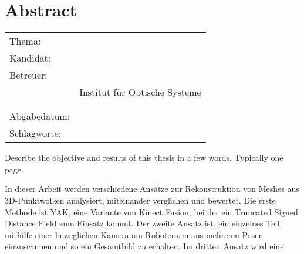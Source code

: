 \thispagestyle{plain}
\chapter*{Abstract}
\label{ch:abstract}


\begin{center}
	\begin{tabular}{p{3cm}p{10cm}}
		Thema: & \thema \\[1ex]
		Kandidat: & \autor \\[1ex]
		Betreuer: & \prueferA \\%
		 & Institut für Optische Systeme\\[1ex]
		 & \prueferB \\%
		 & \firma \\[1ex]
		Abgabedatum: & \abgabedatum \\[1ex]
		Schlagworte: & \schlagworte \\
	\end{tabular}
\end{center}


Describe the objective and results of this thesis in a few words.
Typically one page. %

In dieser Arbeit werden verschiedene Ansätze zur Rekonstruktion von Meshes aus 3D-Punktwolken analysiert, miteinander verglichen und bewertet.
Die erste Methode ist YAK, eine Variante von Kinect Fusion, bei der ein Truncated Signed Distance Field zum Einsatz kommt.
Der zweite Ansatz ist, ein einzelnes Teil mithilfe einer beweglichen Kamera am Roboterarm aus mehreren Posen einzuscannen und so ein Gesamtbild zu erhalten.
Im dritten Ansatz wird eine 

\newpage
